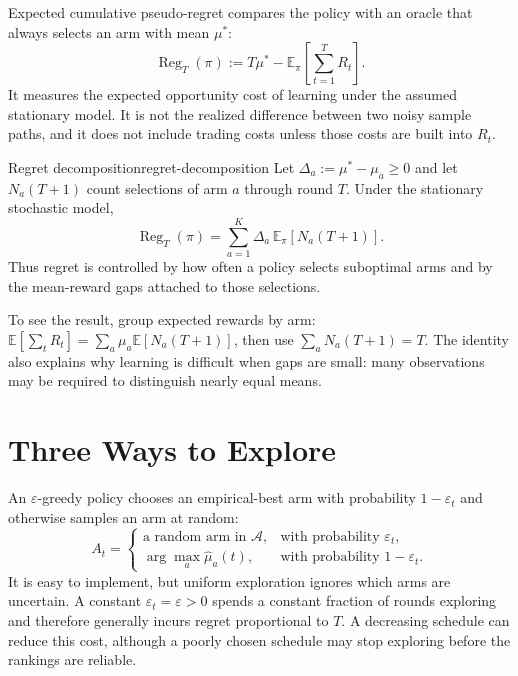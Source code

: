 \documentclass[11pt]{article}
\newcommand{\E}{\mathbb{E}}
\begin{document}
Expected cumulative pseudo-regret compares the policy with an oracle that always selects an arm with mean $\mu^*$:
\begin{equation}
  \label{eq:regret}
  \operatorname{Reg}_T(\pi)
  :=T\mu^*-\E_\pi\!\left[\sum_{t=1}^{T}R_t\right].
\end{equation}
It measures the expected opportunity cost of learning under the assumed stationary model. It is not the realized difference between two noisy sample paths, and it does not include trading costs unless those costs are built into $R_t$.

\begin{theorem}{Regret decomposition}{regret-decomposition}
Let $\Delta_a:=\mu^*-\mu_a\geq 0$ and let $N_a(T+1)$ count selections of arm $a$ through round $T$. Under the stationary stochastic model,
\begin{equation}
  \label{eq:regret-decomposition}
  \operatorname{Reg}_T(\pi)
  =\sum_{a=1}^{K}\Delta_a\,\E_\pi[N_a(T+1)].
\end{equation}
Thus regret is controlled by how often a policy selects suboptimal arms and by the mean-reward gaps attached to those selections.
\end{theorem}

To see the result, group expected rewards by arm:
$\E[\sum_t R_t]=\sum_a\mu_a\E[N_a(T+1)]$, then use
$\sum_a N_a(T+1)=T$. The identity also explains why learning is difficult when gaps are small: many observations may be required to distinguish nearly equal means.

\section{Three Ways to Explore}

An $\varepsilon$-greedy policy chooses an empirical-best arm with probability $1-\varepsilon_t$ and otherwise samples an arm at random:
\begin{equation}
  \label{eq:epsilon-greedy}
  A_t=
  \begin{cases}
    \text{a random arm in $\mathcal A$}, & \text{with probability }\varepsilon_t,\\
    \arg\max_a\widehat\mu_a(t), & \text{with probability }1-\varepsilon_t.
  \end{cases}
\end{equation}
It is easy to implement, but uniform exploration ignores which arms are uncertain. A constant $\varepsilon_t=\varepsilon>0$ spends a constant fraction of rounds exploring and therefore generally incurs regret proportional to $T$. A decreasing schedule can reduce this cost, although a poorly chosen schedule may stop exploring before the rankings are reliable.
\end{document}
